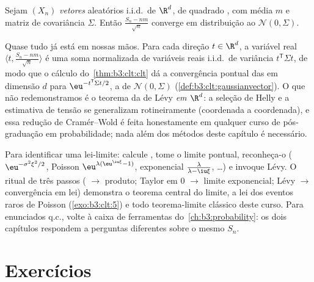 \begin{theorem}
\label{thm:b3:clt:multiclt}
Sejam $(X_n)$ \emph{vetores} aleatórios i.i.d.\ de $\R^d$, de
quadrado , com média $m$ e matriz de covariância
$\Sigma$. Então $\frac{S_n - nm}{\sqrt n}$ converge em distribuição ao 
$\mathcal N(0,
\Sigma)$.
\admitted
\end{theorem}

\begin{remark}\label{rem:b3:clt:multiclt}
Quase tudo já está em nossas mãos. Para cada direção $t \in \R^d$, a variável
real $\langle t,
\frac{S_n - nm}{\sqrt n}\rangle$ é uma soma normalizada de variáveis reais i.i.d.\ de variância
$t^{\mathsf T}\Sigma t$, de modo que o cálculo do~\cref{thm:b3:clt:clt} dá a convergência pontual
das  em dimensão $d$ para $\eu^{-t^{\mathsf T}\Sigma t/2}$, a  de $\mathcal N(0, \Sigma)$ (\cref{def:b3:clt:gaussianvector}). O que não redemonstramos é o
teorema da  de Lévy \emph{em $\R^d$}: a seleção de Helly
e a estimativa de tensão se generalizam rotineiramente (coordenada a
coordenada), e essa redução de Cramér--Wold é feita honestamente em
qualquer curso de pós-graduação em probabilidade; nada além dos métodos
deste capítulo é necessário.
\end{remark}

\begin{method}\label{met:b3:clt:method}
Para identificar uma lei-limite: calcule , tome o
limite pontual, reconheça-o ( $\eu^{-\sigma^2\xi^2/2}$, Poisson $\eu^{\lambda(\eu^{\iu\xi}-1)}$, exponencial
$\frac{\lambda}
{\lambda - \iu\xi}$, \dots) e invoque Lévy. O ritual de três passos (
$\to$ produto; Taylor em $0$ $\to$ limite exponencial; Lévy
$\to$ convergência em lei) demonstra o teorema central do limite, a
lei dos eventos raros de Poisson (\cref{exo:b3:clt:5}) e todo teorema-limite
clássico deste curso. Para enunciados q.c., volte à caixa de ferramentas
do~\cref{ch:b3:probability}: os dois capítulos respondem a perguntas diferentes
sobre o mesmo $S_n$.
\end{method}

\section{Exercícios}

